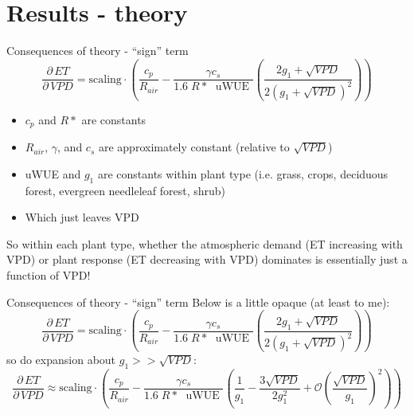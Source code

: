 \documentclass{beamer}
\begin{document}
\section{Results - theory}
\begin{frame}{Consequences of theory - ``sign'' term}
  \[\frac{\partial \, ET}{\partial \, VPD} = \text{scaling} \cdot \left(\frac{ c_p}{R_{air}} - \frac{\gamma c_s }{1.6 \; R*\; \text{ uWUE }} \left( \frac{2 g_1 + \sqrt{VPD}}{2 (g_1 + \sqrt{VPD})^2}\right) \right)\]
  \begin{itemize}
  \item $c_p$ and $R*$ are constants
  \item $R_{air}$, $\gamma$, and $c_s$ are approximately constant (relative to $\sqrt{VPD}$)
  \item uWUE and $g_1$ are constants within plant type (i.e. grass, crops, deciduous forest, evergreen needleleaf forest, shrub)
  \item Which just leaves VPD
  \end{itemize}
  So within each plant type, whether the atmospheric demand (ET increasing with VPD) or plant response (ET decreasing with VPD) dominates is essentially just a function of VPD!
\end{frame}

\begin{frame}{Consequences of theory - ``sign'' term}
Below is a little opaque (at least to me):
\[\frac{\partial \, ET}{\partial \, VPD} = \text{scaling} \cdot  \left(\frac{ c_p}{R_{air}} - \frac{\gamma c_s }{1.6 \; R*\; \text{ uWUE }} \left( \frac{2 g_1 + \sqrt{VPD}}{2 (g_1 + \sqrt{VPD})^2}\right) \right)\]
so do expansion about $g_1 >> \sqrt{VPD}$:
\footnotesize
\[ \frac{\partial \, ET}{\partial \, VPD} \approx \text{scaling} \cdot  \left(\frac{ c_p}{R_{air}} - \frac{\gamma c_s }{1.6 \; R*\; \text{ uWUE }} \left( \frac{1}{g_1} - \frac{3\sqrt{VPD}}{2 g_1^2} +  \mathcal{O}\left(\frac{\sqrt{VPD}}{g_1}\right)^{2} \right) \right)\]

\end{frame}
\end{document}
